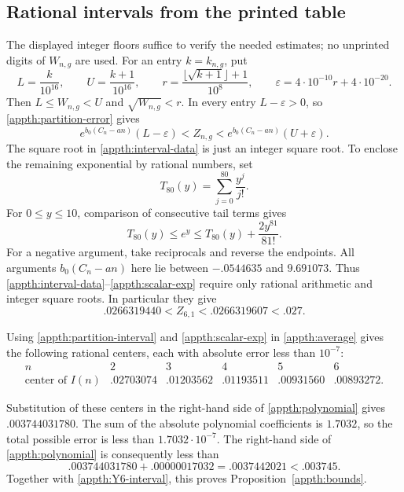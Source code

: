 \subsection{Rational intervals from the printed table}

The displayed integer floors suffice to verify the needed estimates; no
unprinted digits of $W_{n,g}$ are used. For an entry $k=k_{n,g}$, put
\begin{equation}\label{appth:interval-data}
 L=\frac{k}{10^{16}},\qquad U=\frac{k+1}{10^{16}},\qquad
 r=\frac{\lfloor\sqrt{k+1}\rfloor+1}{10^8},\qquad
 \varepsilon=4\cdot10^{-10}r+4\cdot10^{-20}.
\end{equation}
Then $L\le W_{n,g}<U$ and $\sqrt{W_{n,g}}<r$. In every entry
$L-\varepsilon>0$, so \eqref{appth:partition-error} gives
\begin{equation}\label{appth:partition-interval}
 e^{b_0(C_n-an)}(L-\varepsilon)
       <Z_{n,g}<e^{b_0(C_n-an)}(U+\varepsilon).
\end{equation}
The square root in \eqref{appth:interval-data} is just an integer square
root. To enclose the remaining exponential by rational numbers, set
\[
 T_{80}(y)=\sum_{j=0}^{80}\frac{y^j}{j!}.
\]
For $0\le y\le10$, comparison of consecutive tail terms gives
\begin{equation}\label{appth:scalar-exp}
 T_{80}(y)\le e^y
       \le T_{80}(y)+\frac{2y^{81}}{81!}.
\end{equation}
For a negative argument, take reciprocals and reverse the endpoints.
All arguments $b_0(C_n-an)$ here lie between $-.0544635$ and $9.691073$.
Thus \eqref{appth:interval-data}--\eqref{appth:scalar-exp} require only
rational arithmetic and integer square roots. In particular they give
\begin{equation}\label{appth:Y6-interval}
 .0266319440<Z_{6,1}<.0266319607<.027.
\end{equation}

Using \eqref{appth:partition-interval} and \eqref{appth:scalar-exp} in
\eqref{appth:average} gives the following rational centers, each with
absolute error less than $10^{-7}$:
\begin{equation}\label{appth:moment-centers}
\begin{array}{c|ccccc}
 n&2&3&4&5&6\\\hline
 \text{center of }I(n)
 &.02703074&.01203562&.01193511&.00931560&.00893272.
\end{array}
\end{equation}

Substitution of these centers in the right-hand side of
\eqref{appth:polynomial} gives $.003744031780$. The sum of the absolute
polynomial coefficients is $1.7032$, so the total possible error is less
than $1.7032\cdot10^{-7}$. The right-hand side of
\eqref{appth:polynomial} is consequently less than
\[
 .003744031780+.00000017032=.0037442021<.003745.
\]
Together with \eqref{appth:Y6-interval}, this proves
Proposition~\ref{appth:bounds}.
